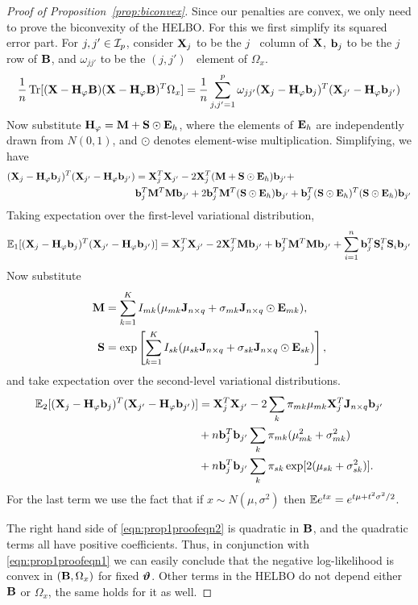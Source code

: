 \documentclass[11pt,letterpaper]{article}
\DeclareMathOperator*{\Tr}{Tr}
\DeclareMathOperator*{\Th}{^{\text{th}}}
\numberwithin{equation}{section}
\begin{document}
\begin{proof}[Proof of Proposition~\ref{prop:biconvex}]
Since our penalties are convex, we only need to prove the biconvexity of the HELBO. For this we first simplify its squared error part. For $j,j' \in {\cal{I}}_p$, consider ${\mathbf{X}}_j$ to be the $j\Th$ column of ${\mathbf{X}}$, ${\bf{b}}_j$ to be the $j\Th$ row of ${\mathbf{B}}$, and $\omega_{jj'}$ to be the $(j,j')\Th$ element of $\Omega_x$.
%
\begin{align}\label{eqn:prop1proofeqn1}
\frac{1}{n} \Tr [ (\bfX - \bfH_\varphi \bfB)
(\bfX - \bfH_\varphi \bfB)^T \Omega_x ] =
\frac{1}{n} \sum_{j,j'=1}^p \omega_{jj'}
(\bfX_j - \bfH_\varphi \bfb_j)^T (\bfX_{j'} - \bfH_\varphi \bfb_{j'})
\end{align}
%
Now substitute ${\mathbf{H}}_\varphi = {\mathbf{M}} + {\mathbf{S}} \odot {\mathbf{E}}_h$, where the elements of ${\mathbf{E}}_h$ are independently drawn from $N(0,1)$, and $\odot$ denotes element-wise multiplication. Simplifying, we have
%
\begin{align*}
({\mathbf{X}}_j - {\mathbf{H}}_\varphi {\bf{b}}_j)^T ({\mathbf{X}}_{j'} - {\mathbf{H}}_\varphi {\bf{b}}_{j'}) &= {\mathbf{X}}_j^T {\mathbf{X}}_{j'} - 2 {\mathbf{X}}_j^T ({\mathbf{M}} + {\mathbf{S}} \odot {\mathbf{E}}_h) {\bf{b}}_{j'} +\\
& {\bf{b}}_j^T {\mathbf{M}}^T {\mathbf{M}} {\bf{b}}_{j'} + 2 {\bf{b}}_j^T {\mathbf{M}}^T ({\mathbf{S}} \odot {\mathbf{E}}_h) {\bf{b}}_{j'} + {\bf{b}}_j^T ({\mathbf{S}} \odot {\mathbf{E}}_h)^T ({\mathbf{S}} \odot {\mathbf{E}}_h) {\bf{b}}_{j'}
\end{align*}
%
Taking expectation over the first-level variational distribution,
%
$$
{\mathbb{E}}_1 [({\mathbf{X}}_j - {\mathbf{H}}_\varphi {\bf{b}}_j)^T ({\mathbf{X}}_{j'} - {\mathbf{H}}_\varphi {\bf{b}}_{j'})] = {\mathbf{X}}_j^T {\mathbf{X}}_{j'} - 2 {\mathbf{X}}_j^T {\mathbf{M}} {\bf{b}}_{j'} +
{\bf{b}}_j^T {\mathbf{M}}^T {\mathbf{M}} {\bf{b}}_{j'} +
\sum_{i=1}^n {\bf{b}}_j^T {\mathbf{S}}_i^T {\mathbf{S}}_i {\bf{b}}_{j'}
$$
%
Now substitute
%
\begin{align*}
{\mathbf{M}} &= \sum_{k=1}^K I_{mk} (\mu_{mk} {\mathbf{J}}_{n \times q} + \sigma_{mk} {\mathbf{J}}_{n \times q} \odot {\mathbf{E}}_{mk}),\\
{\mathbf{S}} &= \exp \left[ \sum_{k=1}^K I_{sk} (\mu_{sk} {\mathbf{J}}_{n \times q} + \sigma_{sk} {\mathbf{J}}_{n \times q} \odot {\mathbf{E}}_{sk}) \right]
,
\end{align*}
%
and take expectation over the second-level variational distributions.
\begin{align}
{\mathbb{E}}_2 [({\mathbf{X}}_j - {\mathbf{H}}_\varphi {\bf{b}}_j)^T ({\mathbf{X}}_{j'} - {\mathbf{H}}_\varphi {\bf{b}}_{j'})] &= {\mathbf{X}}_j^T {\mathbf{X}}_{j'} -
2\sum_{k} \pi_{mk}\mu_{mk} {\mathbf{X}}_j^T {\mathbf{J}}_{n\times q}{\bf{b}}_{j'} \notag\\
&+ n {\bf{b}}_j^T {\bf{b}}_{j'} \sum_k \pi_{mk} (\mu_{mk}^2 + \sigma_{mk}^2)\notag\\
&+  n {\bf{b}}_j^T {\bf{b}}_{j'} \sum_k \pi_{sk} \exp[2 (\mu_{sk} + \sigma_{sk}^2)]. \label{eqn:prop1proofeqn2}
\end{align}
%
For the last term we use the fact that if $x \sim N(\mu,\sigma^2)$ then ${\mathbb{E}} e^{tx} = e^{t\mu + t^2 \sigma^2/2}$.

The right hand side of \eqref{eqn:prop1proofeqn2} is quadratic in ${\mathbf{B}}$, and the quadratic terms all have positive coefficients. Thus, in conjunction with \eqref{eqn:prop1proofeqn1} we can easily conclude that the negative log-likelihood is convex in $({\mathbf{B}},\Omega_x)$ for fixed ${\boldsymbol{\vartheta}}$. Other terms in the HELBO do not depend either ${\mathbf{B}}$ or $\Omega_x$, the same holds for it as well.
\end{proof}
\end{document}
